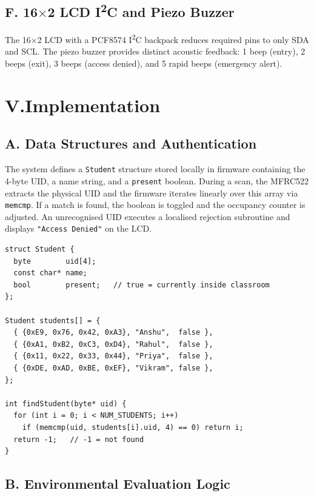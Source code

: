 \documentclass[12pt,a4paper]{article}
\begin{document}
\subsection*{F. 16$\times$2 LCD I\textsuperscript{2}C and Piezo Buzzer}
The 16$\times$2 LCD with a PCF8574 I\textsuperscript{2}C backpack reduces required pins to only SDA and
SCL. The piezo buzzer provides distinct acoustic feedback: 1 beep (entry), 2 beeps
(exit), 3 beeps (access denied), and 5 rapid beeps (emergency alert).

\section*{V.\quad Implementation}

\subsection*{A. Data Structures and Authentication}

The system defines a \texttt{Student} structure stored locally in firmware containing the
4-byte UID, a name string, and a \texttt{present} boolean. During a scan, the MFRC522
extracts the physical UID and the firmware iterates linearly over this array via
\texttt{memcmp}. If a match is found, the boolean is toggled and the occupancy counter
is adjusted. An unrecognised UID executes a localised rejection subroutine and displays
\texttt{"Access Denied"} on the LCD.

\begin{lstlisting}[caption={Student data structure and RFID authentication (main.cpp)},
                   label=lst:student]
struct Student {
  byte        uid[4];
  const char* name;
  bool        present;   // true = currently inside classroom
};

Student students[] = {
  { {0xE9, 0x76, 0x42, 0xA3}, "Anshu",  false },
  { {0xA1, 0xB2, 0xC3, 0xD4}, "Rahul",  false },
  { {0x11, 0x22, 0x33, 0x44}, "Priya",  false },
  { {0xDE, 0xAD, 0xBE, 0xEF}, "Vikram", false },
};

int findStudent(byte* uid) {
  for (int i = 0; i < NUM_STUDENTS; i++)
    if (memcmp(uid, students[i].uid, 4) == 0) return i;
  return -1;   // -1 = not found
}
\end{lstlisting}

\subsection*{B. Environmental Evaluation Logic}
\end{document}
